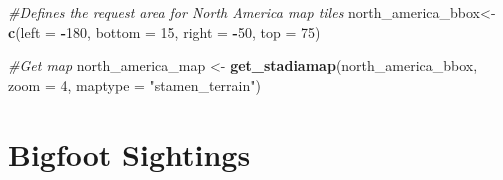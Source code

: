 \documentclass[
]{article}
\newenvironment{Shaded}{\begin{snugshade}}{\end{snugshade}}
\newcommand{\AttributeTok}[1]{\textcolor[rgb]{0.13,0.29,0.53}{#1}}
\newcommand{\CommentTok}[1]{\textcolor[rgb]{0.56,0.35,0.01}{\textit{#1}}}
\newcommand{\DecValTok}[1]{\textcolor[rgb]{0.00,0.00,0.81}{#1}}
\newcommand{\FunctionTok}[1]{\textcolor[rgb]{0.13,0.29,0.53}{\textbf{#1}}}
\newcommand{\NormalTok}[1]{#1}
\newcommand{\OtherTok}[1]{\textcolor[rgb]{0.56,0.35,0.01}{#1}}
\newcommand{\SpecialCharTok}[1]{\textcolor[rgb]{0.81,0.36,0.00}{\textbf{#1}}}
\newcommand{\StringTok}[1]{\textcolor[rgb]{0.31,0.60,0.02}{#1}}
\begin{document}
\begin{Shaded}
\begin{Highlighting}[]
\CommentTok{\#Defines the request area for North America map tiles}
\NormalTok{north\_america\_bbox}\OtherTok{\textless{}{-}}\FunctionTok{c}\NormalTok{(}\AttributeTok{left =} \SpecialCharTok{{-}}\DecValTok{180}\NormalTok{, }\AttributeTok{bottom =} \DecValTok{15}\NormalTok{, }\AttributeTok{right =} \SpecialCharTok{{-}}\DecValTok{50}\NormalTok{, }\AttributeTok{top =} \DecValTok{75}\NormalTok{)}

\CommentTok{\#Get map}
\NormalTok{north\_america\_map }\OtherTok{\textless{}{-}} \FunctionTok{get\_stadiamap}\NormalTok{(north\_america\_bbox, }\AttributeTok{zoom =} \DecValTok{4}\NormalTok{, }\AttributeTok{maptype =} \StringTok{"stamen\_terrain"}\NormalTok{)}
\end{Highlighting}
\end{Shaded}

\section{Bigfoot Sightings}\label{bigfoot-sightings}
\end{document}

